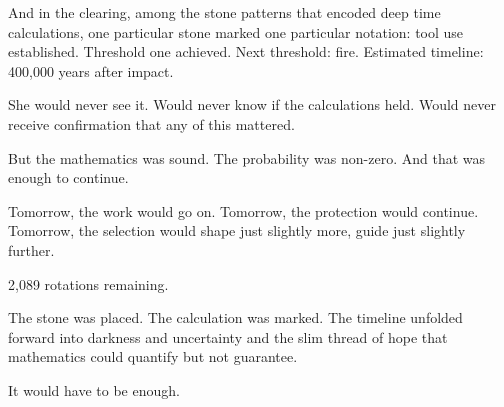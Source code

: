 And in the clearing, among the stone patterns that encoded deep time calculations, one particular stone marked one particular notation: tool use established. Threshold one achieved. Next threshold: fire. Estimated timeline: 400,000 years after impact.

She would never see it. Would never know if the calculations held. Would never receive confirmation that any of this mattered.

But the mathematics was sound. The probability was non-zero. And that was enough to continue.

Tomorrow, the work would go on. Tomorrow, the protection would continue. Tomorrow, the selection would shape just slightly more, guide just slightly further.

2,089 rotations remaining.

The stone was placed. The calculation was marked. The timeline unfolded forward into darkness and uncertainty and the slim thread of hope that mathematics could quantify but not guarantee.

It would have to be enough.

